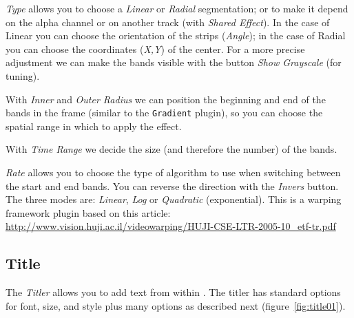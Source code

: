 \textit{Type} allows you to choose a \textit{Linear} or \textit{Radial} segmentation; or to make it depend on the alpha channel or on another track (with \textit{Shared Effect}). In the case of Linear you can choose the orientation of the strips (\textit{Angle}); in the case of Radial you can choose the coordinates (\textit{X,Y}) of the center. For a more precise adjustment we can make the bands visible with the button \textit{Show Grayscale} (for tuning).

With \textit{Inner} and \textit{Outer Radius} we can position the beginning and end of the bands in the frame (similar to the \texttt{Gradient} plugin), so you can choose the spatial range in which to apply the effect.

With \textit{Time Range} we decide the size (and therefore the number) of the bands.

\textit{Rate} allows you to choose the type of algorithm to use when switching between the start and end bands. You can reverse the direction with the \textit{Invers} button. The three modes are: \textit{Linear}, \textit{Log} or \textit{Quadratic} (exponential). This is a warping framework plugin based on this article: {\small \url{http://www.vision.huji.ac.il/videowarping/HUJI-CSE-LTR-2005-10_etf-tr.pdf}}

\subsection{Title}%
\label{sub:title}

The \textit{Titler} allows you to add text from within \CGG{}. The titler has standard options for font, size, and style plus many options as described next (figure~\ref{fig:title01}).

